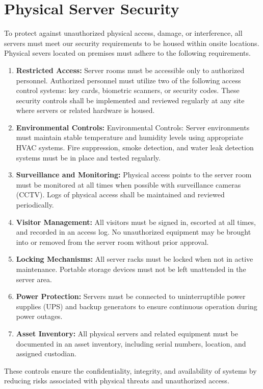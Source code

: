 \section{Physical Server Security}
To protect against unauthorized physical access, damage, or interference, all servers must meet our security requirements to be housed within onsite locations. Physical severs located on premises must adhere to the following requirements.
\begin{enumerate}
    \item \textbf{Restricted Access:}
    Server rooms must be accessible only to authorized personnel. Authorized personnel must  utilize two of the following access control systems: key cards, biometric scanners, or security codes. These security controls shall be implemented and reviewed regularly at any site where servers or related hardware is housed.
    \item \textbf{Environmental Controls:}
    Environmental Controls: Server environments must maintain stable temperature and humidity levels using appropriate HVAC systems. Fire suppression, smoke detection, and water leak detection systems must be in place and tested regularly.
    \item \textbf{Surveillance and Monitoring:}
    Physical access points to the server room must be monitored at all times when possible with surveillance cameras (CCTV). Logs of physical access shall be maintained and reviewed periodically.
    \item \textbf{Visitor Management:}
     All visitors must be signed in, escorted at all times, and recorded in an access log. No unauthorized equipment may be brought into or removed from the server room without prior approval.
     \item \textbf{Locking Mechanisms:}
     All server racks must be locked when not in active maintenance. Portable storage devices must not be left unattended in the server area.
     \item \textbf{Power Protection:}
     Servers must be connected to uninterruptible power supplies (UPS) and backup generators to ensure continuous operation during power outages.
     \item \textbf{Asset Inventory:}
     All physical servers and related equipment must be documented in an asset inventory, including serial numbers, location, and assigned custodian.
\end{enumerate}
These controls ensure the confidentiality, integrity, and availability of systems by reducing risks associated with physical threats and unauthorized access.


